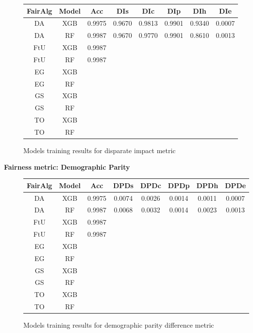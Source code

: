 \begin{figure}[H]
    \centering
    \begin{tabular}{|c|c|c|c|c|c|c|c|}
        \hline
        \textbf{FairAlg} & \textbf{Model} & \textbf{Acc} & \textbf{DIs} & \textbf{DIc} & \textbf{DIp} & \textbf{DIh} & \textbf{DIe} \\
        \hline
        DA & XGB & 0.9975 & 0.9670 & 0.9813 & 0.9901 & 0.9340 & 0.0007 \\
        DA & RF & 0.9987 & 0.9670 & 0.9770 & 0.9901 & 0.8610 & 0.0013 \\
        FtU & XGB & 0.9987 &  &  & & & \\
        FtU & RF & 0.9987 &  &  & & & \\
        EG & XGB & &  &  & & & \\
        EG & RF & &  &  & & & \\
        GS & XGB & &  &  & & & \\
        GS & RF & &  &  & & &\\
        TO & XGB & &  &  & & & \\
        TO & RF & &  &  & & & \\
        \hline
    \end{tabular}
    \caption{Models training results for disparate impact metric}
    \label{fig:results}
\end{figure}
\newpage
\textbf{Fairness metric: Demographic Parity}

\begin{figure}[H]
    \centering
    \begin{tabular}{|c|c|c|c|c|c|c|c|}
        \hline
        \textbf{FairAlg} & \textbf{Model} & \textbf{Acc} & \textbf{DPDs} & \textbf{DPDc} & \textbf{DPDp} & \textbf{DPDh} & \textbf{DPDe} \\
        \hline
        DA & XGB & 0.9975 & 0.0074 & 0.0026 & 0.0014 & 0.0011 & 0.0007\\
        DA & RF & 0.9987 & 0.0068 & 0.0032 & 0.0014 & 0.0023 & 0.0013\\
        FtU & XGB & 0.9987 &  &  & & & \\
        FtU & RF & 0.9987 &  &  & & & \\
        EG & XGB & &  &  & & & \\
        EG & RF & &  &  & & & \\
        GS & XGB & &  &  & & & \\
        GS & RF & &  &  & & &\\
        TO & XGB & &  &  & & & \\
        TO & RF & &  &  & & & \\
        \hline
    \end{tabular}
    \caption{Models training results for demographic parity difference metric}
    \label{fig:results}
\end{figure}